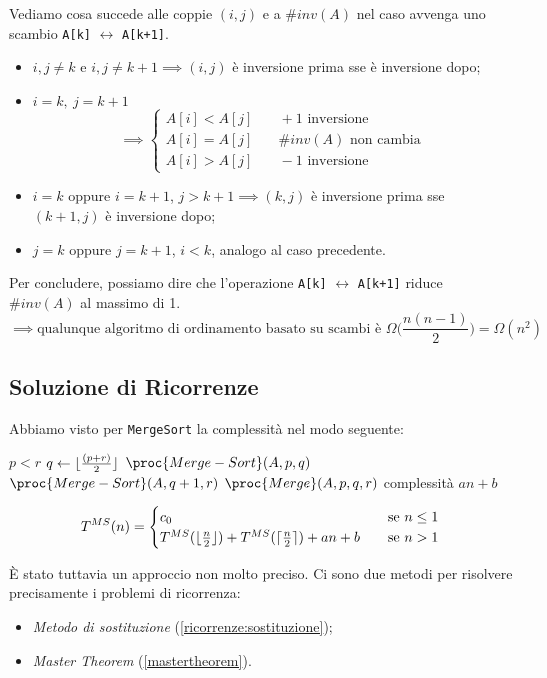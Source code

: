Vediamo cosa succede alle coppie $(i,j)$ e a $\# inv(A)$ nel caso avvenga uno scambio \texttt{A[k]}
$\leftrightarrow$ \texttt{A[k+1]}.

\begin{itemize}
	\item $i,j \neq k$ e $i,j \neq k+1 \implies (i,j)$ è inversione prima sse è inversione dopo;
	\item $i = k, \ j = k+1$
	\[ \implies
	\begin{cases}
		A[i] < A[j] & \quad +1 \text{ inversione} \\
		A[i] = A[j] & \quad \# inv(A) \text{ non cambia} \\
		A[i] > A[j] & \quad -1 \text{ inversione}
	\end{cases}
	\]
	\item $i = k$ oppure $i = k+1$, $j > k+1 \implies (k,j)$ è inversione prima sse $(k+1,j)$ è
	inversione dopo;
	\item $j = k$ oppure $j = k+1$, $i < k$, analogo al caso precedente.
\end{itemize}

Per concludere, possiamo dire che l'operazione \texttt{A[k]} $\leftrightarrow$ \texttt{A[k+1]}
riduce $\# inv(A)$ al massimo di 1.
\begin{displaymath}
	\implies \text{qualunque algoritmo di ordinamento basato su scambi è } \Omega \Big(\frac{n(n-1)}{2} \Big) = \Omega (n^2)
\end{displaymath}

\subsection{Soluzione di Ricorrenze}
Abbiamo visto per \texttt{MergeSort} la complessità nel modo seguente:

\begin{codebox}
	\li \If $p < r$
	\li \Then
			$q \gets \lfloor\frac{(p + r)}{2}\rfloor$ 
	\li     $\proc{Merge-Sort}(A,p,q)$
	\li     $\proc{Merge-Sort}(A,q+1,r)$
	\li     $\proc{Merge}(A,p,q,r)$
				\Comment complessità $an + b$
		\End
\end{codebox}

\[ T^{MS}(n) =
\begin{cases}
c_0       & \quad \text{se } n \leq 1 \\
T^{MS}(\lfloor\frac{n}{2}\rfloor)+T^{MS}(\lceil\frac{n}{2}\rceil) + an + b  & \quad \text{se } n>1
\end{cases}
\]

È stato tuttavia un approccio non molto preciso. Ci sono due metodi per risolvere precisamente 
i problemi di ricorrenza:
\begin{itemize}[noitemsep]
	\item \emph{Metodo di sostituzione} (\ref{ricorrenze:sostituzione});
	\item \emph{Master Theorem} (\ref{mastertheorem}).
\end{itemize}

